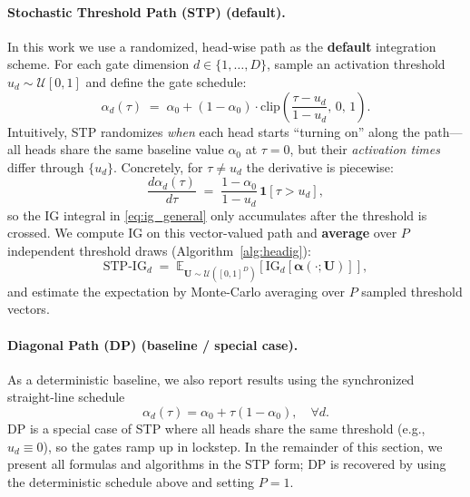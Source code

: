 \paragraph{Stochastic Threshold Path (STP) (default).}
In this work we use a randomized, head-wise path as the \textbf{default} integration scheme.
For each gate dimension $d \in \{1,\dots,D\}$, sample an activation threshold $u_d \sim \mathcal{U}[0,1]$ and define the gate schedule:
\begin{equation}
\alpha_d(\tau) \;=\; \alpha_0 + (1-\alpha_0)\cdot \mathrm{clip}\!\left(\frac{\tau-u_d}{1-u_d},\,0,\,1\right).
\label{eq:alpha_path_stp}
\end{equation}
Intuitively, STP randomizes \emph{when} each head starts ``turning on'' along the path---all heads share the same baseline value $\alpha_0$ at $\tau=0$, but their \emph{activation times} differ through $\{u_d\}$. Concretely, for $\tau \neq u_d$ the derivative is piecewise:
\begin{equation}
\frac{d\alpha_d(\tau)}{d\tau}
\;=\;
\frac{1-\alpha_0}{1-u_d}\,\mathbf{1}[\tau>u_d],
\label{eq:stp_derivative}
\end{equation}
so the IG integral in \eqref{eq:ig_general} only accumulates after the threshold is crossed. We compute IG on this vector-valued path and \textbf{average} over $P$ independent threshold draws (Algorithm~\ref{alg:headig}):
\begin{equation}
\mathrm{STP}\text{-}\mathrm{IG}_d \;=\; \mathbb{E}_{\mathbf{U}\sim \mathcal{U}([0,1]^D)}\!\left[ \mathrm{IG}_d[\boldsymbol{\alpha}(\cdot;\mathbf{U})] \right],
\label{eq:stp_ig_def}
\end{equation}
and estimate the expectation by Monte-Carlo averaging over $P$ sampled threshold vectors.

\paragraph{Diagonal Path (DP) (baseline / special case).}
As a deterministic baseline, we also report results using the synchronized straight-line schedule
\begin{equation}
\alpha_d(\tau) = \alpha_0 + \tau (1-\alpha_0), \quad \forall d.
\label{eq:alpha_path_diagonal}
\end{equation}
DP is a special case of STP where all heads share the same threshold (e.g., $u_d \equiv 0$), so the gates ramp up in lockstep. In the remainder of this section, we present all formulas and algorithms in the STP form; DP is recovered by using the deterministic schedule above and setting $P=1$.

